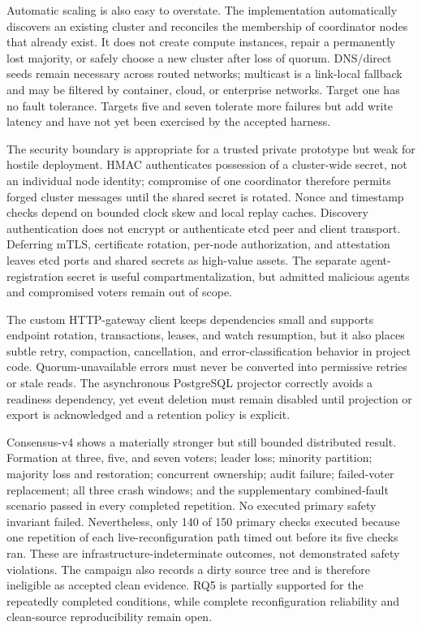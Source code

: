 Automatic scaling is also easy to overstate. The implementation automatically discovers an existing cluster and reconciles the membership of coordinator nodes that already exist. It does not create compute instances, repair a permanently lost majority, or safely choose a new cluster after loss of quorum. DNS/direct seeds remain necessary across routed networks; multicast is a link-local fallback and may be filtered by container, cloud, or enterprise networks. Target one has no fault tolerance. Targets five and seven tolerate more failures but add write latency and have not yet been exercised by the accepted harness.

The security boundary is appropriate for a trusted private prototype but weak for hostile deployment. HMAC authenticates possession of a cluster-wide secret, not an individual node identity; compromise of one coordinator therefore permits forged cluster messages until the shared secret is rotated. Nonce and timestamp checks depend on bounded clock skew and local replay caches. Discovery authentication does not encrypt or authenticate etcd peer and client transport. Deferring mTLS, certificate rotation, per-node authorization, and attestation leaves etcd ports and shared secrets as high-value assets. The separate agent-registration secret is useful compartmentalization, but admitted malicious agents and compromised voters remain out of scope.

The custom HTTP-gateway client keeps dependencies small and supports endpoint rotation, transactions, leases, and watch resumption, but it also places subtle retry, compaction, cancellation, and error-classification behavior in project code. Quorum-unavailable errors must never be converted into permissive retries or stale reads. The asynchronous PostgreSQL projector correctly avoids a readiness dependency, yet event deletion must remain disabled until projection or export is acknowledged and a retention policy is explicit.

Consensus-v4 shows a materially stronger but still bounded distributed result. Formation at three, five, and seven voters; leader loss; minority partition; majority loss and restoration; concurrent ownership; audit failure; failed-voter replacement; all three crash windows; and the supplementary combined-fault scenario passed in every completed repetition. No executed primary safety invariant failed. Nevertheless, only 140 of 150 primary checks executed because one repetition of each live-reconfiguration path timed out before its five checks ran. These are infrastructure-indeterminate outcomes, not demonstrated safety violations. The campaign also records a dirty source tree and is therefore ineligible as accepted clean evidence. RQ5 is partially supported for the repeatedly completed conditions, while complete reconfiguration reliability and clean-source reproducibility remain open.

